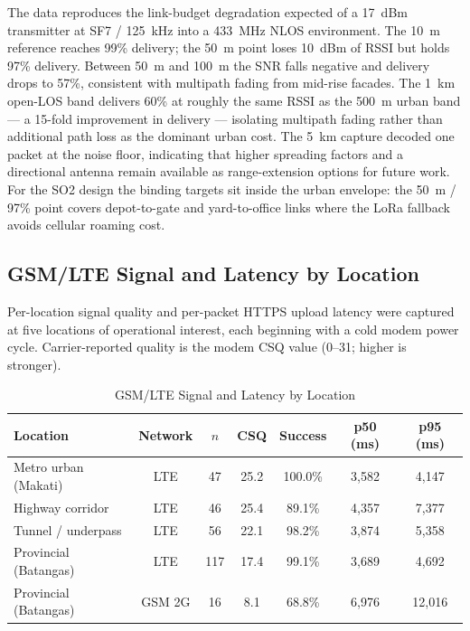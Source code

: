 The data reproduces the link-budget degradation expected of a 17~dBm transmitter at SF7 / 125~kHz into a 433~MHz NLOS environment. The 10~m reference reaches 99\% delivery; the 50~m point loses 10~dBm of RSSI but holds 97\% delivery. Between 50~m and 100~m the SNR falls negative and delivery drops to 57\%, consistent with multipath fading from mid-rise facades. The 1~km open-LOS band delivers 60\% at roughly the same RSSI as the 500~m urban band --- a 15-fold improvement in delivery --- isolating multipath fading rather than additional path loss as the dominant urban cost. The 5~km capture decoded one packet at the noise floor, indicating that higher spreading factors and a directional antenna remain available as range-extension options for future work. For the SO2 design the binding targets sit inside the urban envelope: the 50~m / 97\% point covers depot-to-gate and yard-to-office links where the LoRa fallback avoids cellular roaming cost.

\subsection{GSM/LTE Signal and Latency by Location}
Per-location signal quality and per-packet HTTPS upload latency were captured at five locations of operational interest, each beginning with a cold modem power cycle. Carrier-reported quality is the modem CSQ value (0--31; higher is stronger).

\begin{table}[!htbp]
\centering
\caption{GSM/LTE Signal and Latency by Location}
\label{tab:so2_gsm_lte}
\scriptsize
\setlength{\tabcolsep}{3pt}
\begin{tabular}{|p{}|c|c|c|c|c|c|}
\hline
\textbf{Location} & \textbf{Network} & \textbf{$n$} & \textbf{CSQ} & \textbf{Success} & \textbf{p50 (ms)} & \textbf{p95 (ms)} \\
\hline
Metro urban (Makati) & LTE & 47 & 25.2 & 100.0\% & 3{,}582 & 4{,}147 \\
\hline
Highway corridor & LTE & 46 & 25.4 & 89.1\% & 4{,}357 & 7{,}377 \\
\hline
Tunnel / underpass & LTE & 56 & 22.1 & 98.2\% & 3{,}874 & 5{,}358 \\
\hline
Provincial (Batangas) & LTE & 117 & 17.4 & 99.1\% & 3{,}689 & 4{,}692 \\
\hline
Provincial (Batangas) & GSM 2G & 16 & 8.1 & 68.8\% & 6{,}976 & 12{,}016 \\
\hline
\end{tabular}
\normalsize
\end{table}

